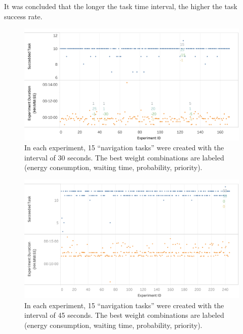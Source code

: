 It was concluded that the longer the task time interval, the higher the task success rate.

\begin{figure}
 \centering
 \includegraphics[width = 1.0\textwidth]{content/images/ch5/execute_experiment_30s.png}
 \caption{In each experiment, 15 ``navigation tasks'' were created with the interval of 30 seconds. The best weight combinations are labeled (energy consumption, waiting time, probability, priority).}
 \label{fig:experiment_task_30s}
\end{figure}

\begin{figure}
 \centering
 \includegraphics[width = 1.0\textwidth]{content/images/ch5/execute_experiment_45s.png}
 \caption{In each experiment, 15 ``navigation tasks'' were created with the interval of 45 seconds. The best weight combinations are labeled (energy consumption, waiting time, probability, priority).}
 \label{fig:experiment_task_45s}
\end{figure}

